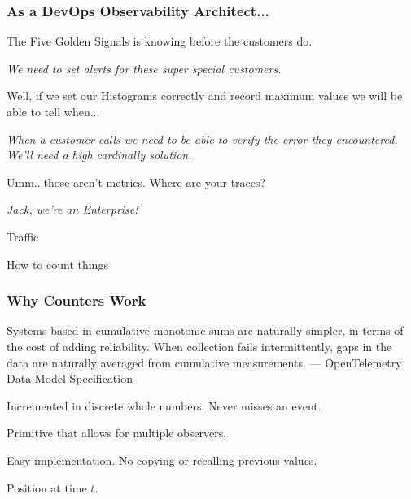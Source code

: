 \begin{frame}
    \frametitle{As a DevOps Observability Architect...}

    The  Five Golden Signals is knowing before the customers do.

    \begin{quotebox}
        \emph{We need to set alerts for these super special customers.}
    \end{quotebox}

    Well, if we set our Histograms correctly and record maximum values we will
    be able to tell when...

    \begin{quotebox}
        \emph{When a customer calls we need to be able to verify the error
            they encountered.  We'll need a high cardinally solution.}
    \end{quotebox}

    Umm...those aren't metrics.  Where are your traces?

    \begin{quotebox}
        \emph{Jack, we're an Enterprise!}
    \end{quotebox}
\end{frame}


\begin{frame}[standout]
    Traffic

    \small{How to count things}
\end{frame}


\begin{frame}
    \frametitle{Why Counters Work}

    \begin{quotebox}
         Systems based in cumulative monotonic sums are naturally simpler, in
         terms of the cost of adding reliability. When collection fails
         intermittently, gaps in the data are naturally averaged from
         cumulative measurements.
         \tcblower
         \hfill --- OpenTelemetry Data Model Specification
    \end{quotebox}

    \begin{description}[labelwidth=\widthof{Synchronization}]
        \item[Accurate] Incremented in discrete whole numbers.  Never misses an event.
        \item[Synchronization] Primitive that allows for multiple observers.
        \item[Low Overhead] Easy implementation.  No copying or recalling previous values.
        \item[Fundamental] Position at time $t$.
    \end{description}

\end{frame}

